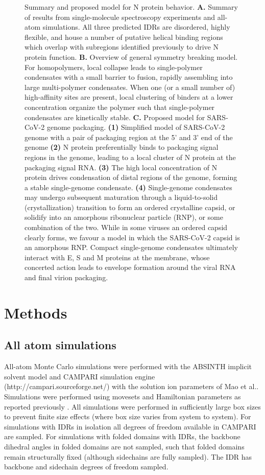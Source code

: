 \documentclass[../main.tex]{subfiles}
\begin{document}
\begin{figure}[!htb]
                {Summary and proposed model for N protein behavior. \textbf{A.} Summary of results from single-molecule spectroscopy experiments and all-atom simulations. All three predicted IDRs are disordered, highly flexible, and house a number of putative helical binding regions which overlap with subregions identified previously to drive N protein function. \textbf{B.} Overview of general symmetry breaking model. For homopolymers, local collapse leads to single-polymer condensates with a small barrier to fusion, rapidly assembling into large multi-polymer condensates. When one (or a small number of) high-affinity sites are present, local clustering of binders at a lower concentration organize the polymer such that single-polymer condensates are kinetically stable. \textbf{C.} Proposed model for SARS-CoV-2 genome packaging. \textbf{(1)} Simplified model of SARS-CoV-2 genome with a pair of packaging region at the 5’ and 3’ end of the genome \textbf{(2)} N protein preferentially binds to packaging signal regions in the genome, leading to a local cluster of N protein at the packaging signal RNA. \textbf{(3)} The high local concentration of N protein drives condensation of distal regions of the genome, forming a stable single-genome condensate. \textbf{(4)} Single-genome condensates may undergo subsequent maturation through a liquid-to-solid (crystallization) transition to form an ordered crystalline capsid, or solidify into an amorphous ribonuclear particle (RNP), or some combination of the two. While in some viruses an ordered capsid clearly forms, we favour a model in which the SARS-CoV-2 capsid is an amorphous RNP. Compact single-genome condensates ultimately interact with E, S and M proteins at the membrane, whose concerted action leads to envelope formation around the viral RNA and final virion packaging.}
            \label{fig:ch6-fig7}
        \end{figure}

    \section{Methods}
    \subsection{All atom simulations}
        All-atom Monte Carlo simulations were performed with the ABSINTH implicit solvent model and CAMPARI simulation engine (http://campari.sourceforge.net/)\cite{Vitalis2009-gh,Mittal2015-sl} with the solution ion parameters of Mao et al.\cite{Mao2012-hr}. Simulations were performed using movesets and Hamiltonian parameters as reported previously \cite{Martin2020-yc,Sherry2017-sr}. All simulations were performed in sufficiently large box sizes to prevent finite size effects (where box size varies from system to system). For simulations with IDRs in isolation all degrees of freedom available in CAMPARI are sampled. For simulations with folded domains with IDRs, the backbone dihedral angles in folded domains are not sampled, such that folded domains remain structurally fixed (although sidechains are fully sampled). The IDR has backbone and sidechain degrees of freedom sampled.
\end{document}
